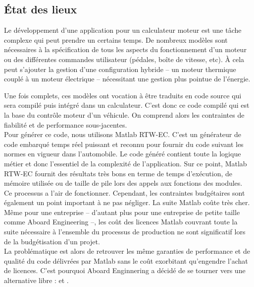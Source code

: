 \subsection{État des lieux}
\label{sec:rtw}
Le développement d'une application pour un calculateur moteur est une tâche
complexe qui peut prendre un certains temps. De nombreux modèles sont
nécessaires à la spécification de tous
les aspects du fonctionnement d'un moteur ou des différentes commandes
utilisateur (pédales, boîte de vitesse, etc). À cela peut s'ajouter
la gestion d'une configuration hybride -- un moteur thermique couplé à un moteur
électrique -- nécessitant une gestion plus pointue de l'énergie.

Une fois complets, ces modèles ont vocation à être traduits en code source qui
sera compilé puis intégré dans un calculateur. C'est donc ce code compilé qui
est la base du contrôle moteur d'un véhicule. On comprend alors les contraintes
de fiabilité et de performance sous-jacentes.\\

Pour générer ce code, nous utilisons Matlab\up{\circledR} RTW-EC\up{\circledR}. C'est un
générateur de code embarqué temps réel puissant et reconnu pour fournir du code
suivant les normes en vigueur dans l'automobile.
Le code généré contient toute la logique métier et donc l'essentiel de la
complexité de l'application. Sur ce point, Matlab\up{\circledR} RTW-EC\up{\circledR}
fournit des résultats très bons en terme de temps d'exécution, de mémoire
utilisée ou de taille de pile lors des appels aux fonctions des modules.\\

Ce processus a l'air de fonctionner. Cependant, les contraintes budgétaires
sont également un point important à ne pas négliger. La suite Matlab\up{\circledR} coûte
très cher. Même pour une entreprise -- d'autant plus pour une entreprise de
petite taille comme Aboard Engineering --, les coût des licences
Matlab\up{\circledR} couvrant toute la suite nécessaire à l'ensemble du
processus de production ne sont significatif lors de la budgétisation d'un projet.\\

La problématique est alors de retrouver les même garanties de performance et de
qualité du code délivrées par Matlab\up{\circledR} sans le coût exorbitant
qu'engendre l'achat de licences. C'est pourquoi Aboard Enginnering a décidé de
se tourner vers une alternative libre :  et .

